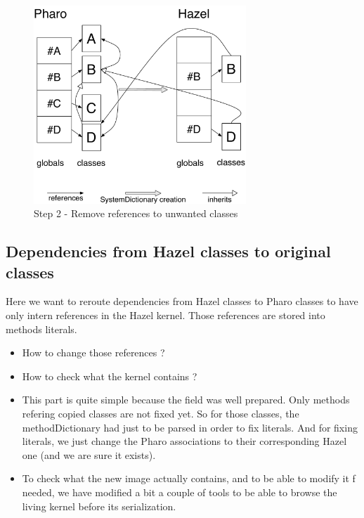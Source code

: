 \begin{figure}[ht]
	\centering\includegraphics[width = 8cm]{figures/CleaningUnnecessaryRefWithInh}
	\caption{Step 2 - Remove references to unwanted classes}
	\label{RemoveDependencies}
\end{figure}

\newpage
\subsection{Dependencies from Hazel classes to original classes}

\goal Here we want to reroute dependencies from Hazel classes to \gls{Pharo} classes to have only intern references in the Hazel kernel. Those references are stored into methods literals.

\problems
\begin{itemize}
	\item How to change those references ?
	\item How to check what the kernel contains ?
\end{itemize}

\solutions 
\begin{itemize}
	\item This part is quite simple because the field was well prepared. Only methods refering copied classes are not fixed yet. So for those classes, the methodDictionary had just to be parsed in order to fix literals. And for fixing literals, we just change the \gls{Pharo} associations to their corresponding Hazel one (and we are sure it exists).
	\item To check what the new image actually contains, and to be able to modify it f needed, we have modified a bit a couple of tools to be able to browse the living kernel before its serialization.
\end{itemize}

